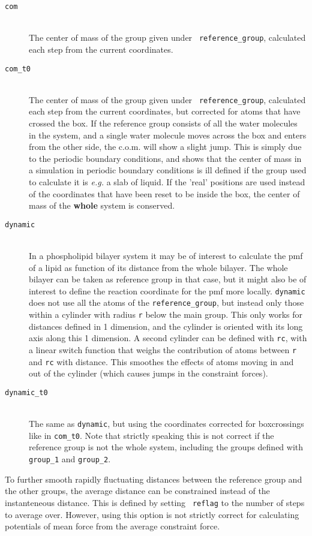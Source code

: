 \begin{description}
\item[\tt com]\mbox{}\\ The center of mass of the group given under {\tt
reference\_group}, calculated each step from the current coordinates. 
\item[\tt com\_t0]\mbox{}\\ The center of mass of the group given under {\tt
reference\_group}, calculated each step from the current coordinates,
but corrected for atoms that have crossed the box. If the reference
group consists of all the water molecules in the system, and a single
water molecule moves across the box and enters from the other side,
the c.o.m. will show a slight jump. This is simply due to the periodic
boundary conditions, and shows that the center of mass in a simulation
in periodic boundary conditions is ill defined if the group
used to calculate it is \emph{e.g.} a slab of liquid. If the 'real'
positions are used instead of the coordinates that have been reset to
be inside the box, the center of mass of the \textbf{whole} system is 
conserved. 
\item[\tt dynamic]\mbox{}\\ In a phospholipid bilayer system it may be of
interest to calculate the pmf of a lipid as function of its distance
from the whole bilayer. The whole bilayer can be taken as reference
group in that case, but it might also be of interest to define the
reaction coordinate for the pmf more locally. {\tt dynamic} does not
use all the atoms of the {\tt reference\_group}, but instead only those
within a cylinder with radius {\tt r} below the main group. This only
works for distances defined in 1 dimension, and the cylinder is
oriented with its long axis along this 1 dimension. A second cylinder
can be defined with {\tt rc}, with a linear switch function that weighs
the contribution of atoms between {\tt r} and {\tt rc} with
distance. This smoothes the effects of atoms moving in and out of the
cylinder (which causes jumps in the constraint forces). 
\item[\tt dynamic\_t0]\mbox{}\\
The same as {\tt dynamic}, but using the coordinates corrected for
boxcrossings like in {\tt com\_t0}. Note that strictly speaking this is
not correct if the reference group is not the whole system, including
the groups defined with {\tt group\_1} and {\tt group\_2}.
\end{description}

To further smooth rapidly fluctuating distances between the reference
group and the other groups, the average distance can be constrained
instead of the instanteneous distance. This is defined by setting {\tt
reflag} to the number of steps to average over. However, using this
option is not strictly correct for calculating potentials of mean
force from the average constraint force. 

